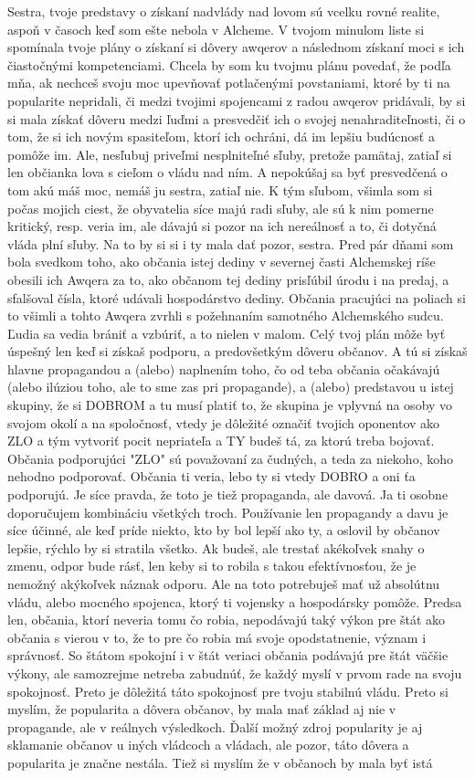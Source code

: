 \documentclass{book}
\begin{document}
Sestra, tvoje predstavy o získaní nadvlády nad lovom sú vcelku rovné realite, aspoň v časoch keď som ešte nebola v Alcheme. V tvojom minulom liste si spomínala tvoje plány o získaní si dôvery awqerov a následnom získaní moci s ich čiastočnými kompetenciami. Chcela by som ku tvojmu plánu povedať, že podľa mňa, ak nechceš svoju moc upevňovať potlačenými povstaniami, ktoré by ti na popularite nepridali, či medzi tvojimi spojencami z radou awqerov pridávali, by si si mala získať dôveru medzi ľuďmi a presvedčiť ich o svojej nenahraditeľnosti, či o tom, že si ich novým spasiteľom, ktorí ich ochráni, dá im lepšiu budúcnosť a pomôže im. Ale, nesľubuj priveľmi nesplniteľné sľuby, pretože pamätaj, zatiaľ si len občianka lova s cieľom o vládu nad ním. A nepokúšaj sa byť presvedčená o tom akú máš moc, nemáš ju sestra, zatiaľ nie. K tým sľubom, všimla som si počas mojich ciest, že obyvatelia síce majú radi sľuby, ale sú k nim pomerne kritický, resp. veria im, ale dávajú si pozor na ich nereálnosť a to, či dotyčná vláda plní sľuby. Na to by si si i ty mala dať pozor, sestra. Pred pár dňami som bola svedkom toho, ako občania istej dediny v severnej časti Alchemskej ríše obesili ich Awqera za to, ako občanom tej dediny prisľúbil úrodu i na predaj, a sfalšoval čísla, ktoré udávali hospodárstvo dediny. Občania pracujúci na poliach si to všimli a tohto Awqera zvrhli s požehnaním samotného Alchemského sudcu. Ľudia sa vedia brániť a vzbúriť, a to nielen v malom. Celý tvoj plán môže byť úspešný len keď si získaš podporu, a predovšetkým dôveru občanov. A tú si získaš hlavne propagandou a (alebo) naplnením toho, čo od teba občania očakávajú (alebo ilúziou toho, ale to sme zas pri propagande), a (alebo) predstavou u istej skupiny, že si DOBROM a tu musí platiť to, že skupina je vplyvná na osoby vo svojom okolí a na spoločnosť, vtedy je dôležité označiť tvojich oponentov ako ZLO a tým vytvoriť pocit nepriateľa a TY budeš tá, za ktorú treba bojovať. Občania podporujúci "$ $ZLO"$ $  sú považovaní za čudných, a teda za niekoho, koho nehodno podporovať. Občania ti veria, lebo ty si vtedy DOBRO a oni ťa podporujú. Je síce pravda, že toto je tiež propaganda, ale davová. Ja ti osobne doporučujem kombináciu všetkých troch. Používanie len propagandy a davu je síce účinné, ale keď príde niekto, kto by bol lepší ako ty, a oslovil by občanov lepšie, rýchlo by si stratila všetko. Ak budeš, ale trestať akékoľvek snahy o zmenu, odpor bude rásť, len keby si to robila s takou efektívnosťou, že je nemožný akýkoľvek náznak odporu. Ale na toto potrebuješ mať už absolútnu vládu, alebo mocného spojenca, ktorý ti vojensky a hospodársky pomôže. Predsa len, občania, ktorí neveria tomu čo robia, nepodávajú taký výkon pre štát ako občania s vierou v to, že to pre čo robia má svoje opodstatnenie, význam i správnosť. So štátom spokojní i v štát veriaci občania podávajú pre štát väčšie výkony, ale samozrejme netreba zabudnúť, že každý myslí v prvom rade na svoju spokojnosť. Preto je dôležitá táto spokojnosť pre tvoju stabilnú vládu. Preto si myslím, že popularita a dôvera občanov, by mala mať základ aj nie v propagande, ale v reálnych výsledkoch. Ďalší možný zdroj popularity je aj sklamanie občanov u iných vládcoch a vládach, ale pozor, táto dôvera a popularita je značne nestála. Tiež si myslím že v občanoch by mala byť istá 
\end{document}
